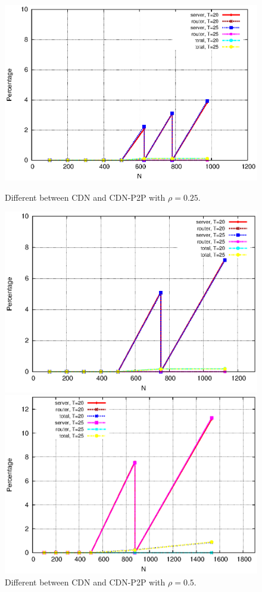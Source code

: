 \documentclass[JIP]{ipsj}
\begin{document}
\begin{figure}[t]
\centering
\begin{minipage}[b]{0.45\linewidth}
	\includegraphics[scale=0.5]{graphs/diff-1.eps}
	\caption{Different between CDN and CDN-P2P with $\rho=0.25$.}
	\label{fig:diff1}
\end{minipage}
\hfill
\begin{minipage}[b]{0.45\linewidth}
	\includegraphics[scale=0.5]{graphs/diff-2.eps}
	\caption{Different between CDN and CDN-P2P with $\rho=0.5$.}
	\label{fig:diff2}
\end{minipage}
\hfill
\begin{minipage}[b]{0.45\linewidth}
	\includegraphics[scale=0.5]{graphs/diff-3.eps}

\end{minipage}
\end{figure}
\end{document}
